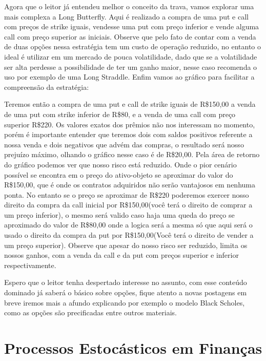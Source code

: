 \documentclass[]{book}
\begin{document}
Agora que o leitor já entendeu melhor o conceito da trava, vamos
explorar uma mais complexa a Long Butterfly. Aqui é realizado a compra
de uma put e call com preços de strike iguais, vendesse uma put com
preço inferior e vende alguma call com preço superior as iniciais.
Observe que pelo fato de contar com a venda de duas opções nessa
estratégia tem um custo de operação reduzido, no entanto o ideal é
utilizar em um mercado de pouca volatilidade, dado que se a volatilidade
ser alta perdesse a possibilidade de ter um ganho maior, nesse caso
recomenda o uso por exemplo de uma Long Straddle. Enfim vamos ao gráfico
para facilitar a compreensão da estratégia:

Teremos então a compra de uma put e call de strike iguais de R\$150,00 a
venda de uma put com strike inferior de R\$80, e a venda de uma call com
preço superior R\$220. Os valores exatos dos prêmios não nos interessam
no momento, porém é importante entender que teremos dois com saldos
positivos referente a nossa venda e dois negativos que advém das
compras, o resultado será nosso prejuízo máximo, olhando o gráfico nesse
caso é de R\$20,00. Pela área de retorno do gráfico podemos ver que
nosso risco está reduzido. Onde o pior cenário possível se encontra em o
preço do ativo-objeto se aproximar do valor do R\$150,00, que é onde os
contratos adquiridos não serão vantajosos em nenhuma ponta. No entanto
se o preço se aproximar de R\$220 poderemos exercer nosso direito da
compra da call inicial por R\$150,00(você terá o direito de comprar a um
preço inferior), o mesmo será valido caso haja uma queda do preço se
aproximado do valor de R\$80,00 onde a logica será a mesma só que aqui
será o usado o direito da compra da put por R\$150,00(Você terá o
direito de vender a um preço superior). Observe que apesar do nosso
risco ser reduzido, limita os nossos ganhos, com a venda da call e da
put com preços superior e inferior respectivamente.

Espero que o leitor tenha despertado interesse no assunto, com esse
conteúdo dominado já saberá o básico sobre opções, fique atento a novas
postagens em breve iremos mais a afundo explicando por exemplo o modelo
Black Scholes, como as opções são precificadas entre outros materiais.

\hypertarget{processos-estocasticos}{\chapter{Processos Estocásticos em
Finanças}\label{processos-estocasticos}}
\end{document}
